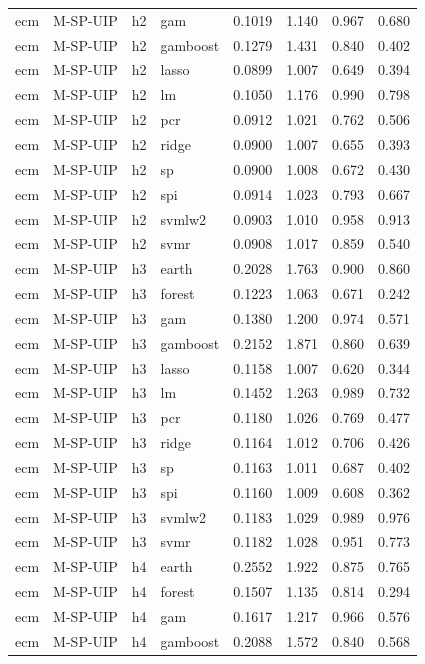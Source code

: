 \begin{ThreePartTable}
\begin{longtable}[t]{llclcccc}
ecm & M-SP-UIP & h2 & gam & 0.1019 & 1.140 & 0.967 & 0.680\\
ecm & M-SP-UIP & h2 & gamboost & 0.1279 & 1.431 & 0.840 & 0.402\\
ecm & M-SP-UIP & h2 & lasso & 0.0899 & 1.007 & 0.649 & 0.394\\
ecm & M-SP-UIP & h2 & lm & 0.1050 & 1.176 & 0.990 & 0.798\\
ecm & M-SP-UIP & h2 & pcr & 0.0912 & 1.021 & 0.762 & 0.506\\
ecm & M-SP-UIP & h2 & ridge & 0.0900 & 1.007 & 0.655 & 0.393\\
ecm & M-SP-UIP & h2 & sp & 0.0900 & 1.008 & 0.672 & 0.430\\
ecm & M-SP-UIP & h2 & spi & 0.0914 & 1.023 & 0.793 & 0.667\\
ecm & M-SP-UIP & h2 & svmlw2 & 0.0903 & 1.010 & 0.958 & 0.913\\
ecm & M-SP-UIP & h2 & svmr & 0.0908 & 1.017 & 0.859 & 0.540\\
\addlinespace
ecm & M-SP-UIP & h3 & earth & 0.2028 & 1.763 & 0.900 & 0.860\\
ecm & M-SP-UIP & h3 & forest & 0.1223 & 1.063 & 0.671 & 0.242\\
ecm & M-SP-UIP & h3 & gam & 0.1380 & 1.200 & 0.974 & 0.571\\
ecm & M-SP-UIP & h3 & gamboost & 0.2152 & 1.871 & 0.860 & 0.639\\
ecm & M-SP-UIP & h3 & lasso & 0.1158 & 1.007 & 0.620 & 0.344\\
ecm & M-SP-UIP & h3 & lm & 0.1452 & 1.263 & 0.989 & 0.732\\
ecm & M-SP-UIP & h3 & pcr & 0.1180 & 1.026 & 0.769 & 0.477\\
ecm & M-SP-UIP & h3 & ridge & 0.1164 & 1.012 & 0.706 & 0.426\\
ecm & M-SP-UIP & h3 & sp & 0.1163 & 1.011 & 0.687 & 0.402\\
ecm & M-SP-UIP & h3 & spi & 0.1160 & 1.009 & 0.608 & 0.362\\
ecm & M-SP-UIP & h3 & svmlw2 & 0.1183 & 1.029 & 0.989 & 0.976\\
ecm & M-SP-UIP & h3 & svmr & 0.1182 & 1.028 & 0.951 & 0.773\\
\addlinespace
ecm & M-SP-UIP & h4 & earth & 0.2552 & 1.922 & 0.875 & 0.765\\
ecm & M-SP-UIP & h4 & forest & 0.1507 & 1.135 & 0.814 & 0.294\\
ecm & M-SP-UIP & h4 & gam & 0.1617 & 1.217 & 0.966 & 0.576\\
ecm & M-SP-UIP & h4 & gamboost & 0.2088 & 1.572 & 0.840 & 0.568\\

\end{longtable}
\end{ThreePartTable}
